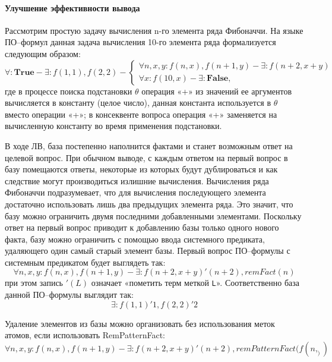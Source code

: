 \paragraph{Улучшение эффективности вывода} Рассмотрим простую задачу вычисления n-го элемента ряда Фибоначчи. На языке ПО--формул данная задача вычисления 10-го элемента ряда формализуется следующим образом:
\begin{equation}
	\forall\colon\boldsymbol{True} - \exists\colon f(1,1), f(2,2) -
	\left\lbrace
	\begin{array}{l}
		\forall n,x,y\colon f(n,x),f(n+1,y) - \exists\colon f(n+2,x+y) \\
		\forall x\colon f(10,x) - \exists\colon \boldsymbol{False},
	\end{array}\right.
\end{equation}
где в процессе поиска подстановки $\theta$ операция «+» из значений ее аргументов вычисляется в константу (целое число), данная константа используется в $\theta$ вместо операции «+»; в консеквенте вопроса операция «+» заменяется на вычисленную константу во время применения подстановки.

В ходе ЛВ, база постепенно наполнится фактами и станет возможным ответ на целевой вопрос. При обычном выводе, с каждым ответом на первый вопрос в базу помещаются ответы, некоторые из которых будут дублироваться и как следствие могут производиться излишние вычисления. Вычисления ряда Фибоначчи подразумевает, что для вычисления последующего элемента достаточно использовать лишь два предыдущих элемента ряда. Это значит, что базу можно ограничить двумя последними добавленными элементами. Поскольку ответ на первый вопрос приводит к добавлению базы только одного нового факта, базу можно ограничить с помощью ввода системного предиката, удаляющего один самый старый элемент базы. Первый вопрос ПО--формулы с системным предикатом будет выглядеть так:
\begin{equation}
	\forall n,x,y\colon f(n,x),f(n+1,y) - \exists\colon f(n+2,x+y)'(n+2), remFact(n)
\end{equation}
при этом запись $'(L)$ означает «пометить терм меткой \texttt{L}». Соответственно база данной ПО--формулы выглядит так:
\begin{equation}
\exists\colon f(1,1)'1, f(2,2)'2
\end{equation}

Удаление элементов из базы можно организовать без использования меток атомов, если использовать RemPatternFact:
\begin{equation}
	\forall n,x,y\colon f(n,x),f(n+1,y) - \exists\colon f(n+2,x+y)'(n+2), remPatternFact(f(n,_))
\end{equation}

